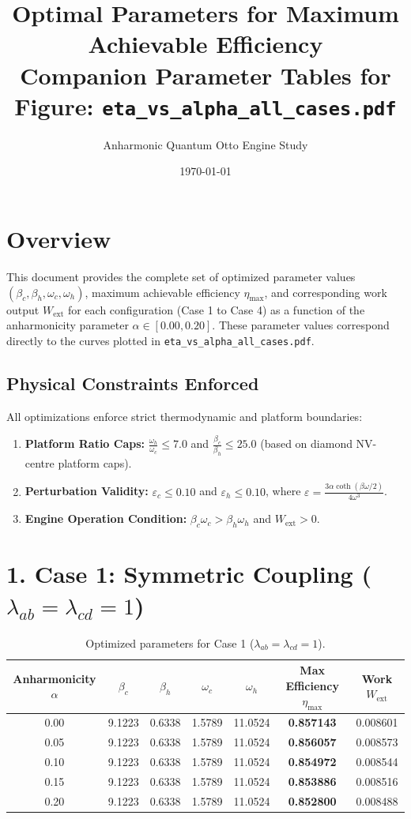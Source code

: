 \documentclass[11pt,a4paper]{article}
\title{\textbf{Optimal Parameters for Maximum Achievable Efficiency}\\
\large Companion Parameter Tables for Figure: \texttt{eta\_vs\_alpha\_all\_cases.pdf}}
\author{Anharmonic Quantum Otto Engine Study}
\date{\today}
\begin{document}
\maketitle

\section*{Overview}
This document provides the complete set of optimized parameter values $(\beta_c, \beta_h, \omega_c, \omega_h)$, maximum achievable efficiency $\eta_{\mathrm{max}}$, and corresponding work output $W_{\mathrm{ext}}$ for each configuration (Case 1 to Case 4) as a function of the anharmonicity parameter $\alpha \in [0.00, 0.20]$. These parameter values correspond directly to the curves plotted in \texttt{eta\_vs\_alpha\_all\_cases.pdf}.

\subsection*{Physical Constraints Enforced}
All optimizations enforce strict thermodynamic and platform boundaries:
\begin{enumerate}
    \item \textbf{Platform Ratio Caps:} $\frac{\omega_h}{\omega_c} \le 7.0$ and $\frac{\beta_c}{\beta_h} \le 25.0$ (based on diamond NV-centre platform caps).
    \item \textbf{Perturbation Validity:} $\varepsilon_c \le 0.10$ and $\varepsilon_h \le 0.10$, where $\varepsilon = \frac{3 \alpha \coth(\beta \omega / 2)}{4 \omega^3}$.
    \item \textbf{Engine Operation Condition:} $\beta_c \omega_c > \beta_h \omega_h$ and $W_{\mathrm{ext}} > 0$.
\end{enumerate}

\section*{1. Case 1: Symmetric Coupling ($\lambda_{ab} = \lambda_{cd} = 1$)}
\begin{table}[h!]
\centering
\caption{Optimized parameters for Case 1 ($\lambda_{ab}=\lambda_{cd}=1$).}
\begin{tabular}{ccccccc}
\toprule
\textbf{Anharmonicity $\alpha$} & $\beta_c$ & $\beta_h$ & $\omega_c$ & $\omega_h$ & \textbf{Max Efficiency $\eta_{\mathrm{max}}$} & \textbf{Work $W_{\mathrm{ext}}$} \\
\midrule
0.00 & 9.1223 & 0.6338 & 1.5789 & 11.0524 & \textbf{0.857143} & 0.008601 \\
0.05 & 9.1223 & 0.6338 & 1.5789 & 11.0524 & \textbf{0.856057} & 0.008573 \\
0.10 & 9.1223 & 0.6338 & 1.5789 & 11.0524 & \textbf{0.854972} & 0.008544 \\
0.15 & 9.1223 & 0.6338 & 1.5789 & 11.0524 & \textbf{0.853886} & 0.008516 \\
0.20 & 9.1223 & 0.6338 & 1.5789 & 11.0524 & \textbf{0.852800} & 0.008488 \\
\bottomrule
\end{tabular}
\end{table}
\end{document}
